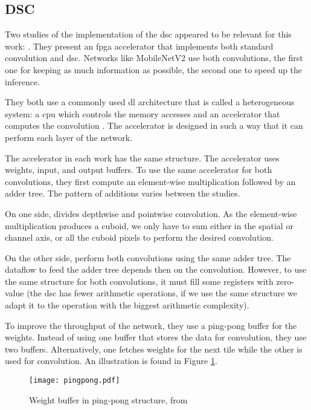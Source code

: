 \subsection{DSC} \label{subsec:impl_dsc}
%
%
Two studies of the implementation of the \acrshort{dsc} appeared to be relevant for this work: \textcite{bai_cnn_2018, liu_fpga-based_2019}. They present an \acrshort{fpga} accelerator that implements both standard convolution and \acrshort{dsc}. Networks like MobileNetV2 use both convolutions, the first one for keeping as much information as possible, the second one to speed up the inference. 

They both use a commonly used \acrshort{dl} architecture that is called a heterogeneous system: a \acrshort{cpu} which controls the memory accesses and an accelerator that computes the convolution \cite{liu_fpga-based_2019}. The accelerator is designed in such a way that it can perform each layer of the network.

The accelerator in each work has the same structure. The accelerator uses weights, input, and output buffers. To use the same accelerator for both convolutions, they first compute an element-wise multiplication followed by an adder tree. The pattern of additions varies between the studies. 

On one side, \textcite{bai_cnn_2018} divides depthwise and pointwise convolution. As the element-wise multiplication produces a cuboid, we only have to sum either in the spatial or channel axis, or all the cuboid pixels to perform the desired convolution. 

On the other side, \textcite{liu_fpga-based_2019} perform both convolutions using the same adder tree. The dataflow to feed the adder tree depends then on the convolution. However, to use the same structure for both convolutions, it must fill some registers with zero-value (the \acrshort{dsc} has fewer arithmetic operations, if we use the same structure we adapt it to the operation with the biggest arithmetic complexity).

To improve the throughput of the network, they use a ping-pong buffer for the weights. Instead of using one buffer that stores the data for convolution, they use two buffers. Alternatively, one fetches weights for the next tile while the other is used for convolution. An illustration is found in Figure \ref{fig:ping_pong_buffer}.
%
\begin{figure}[H]
	\centering
	\texttt{[image: pingpong.pdf]}
	\caption{Weight buffer in ping-pong structure, from \cite{bai_cnn_2018}}
	\label{fig:ping_pong_buffer}
\end{figure}

